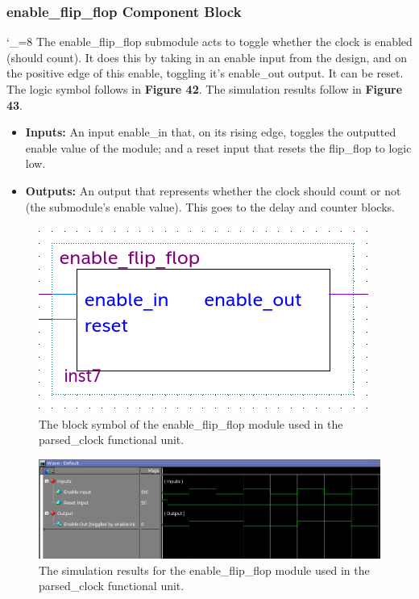 \documentclass[a4paper]{article}
\begin{document}
\subsubsection{enable\_flip\_flop Component Block}
\catcode`_=8
The enable\_flip\_flop submodule acts to toggle whether the clock is enabled (should count). It does this by taking in an enable input from the design, and on the positive edge of this enable, toggling it's enable\_out output. It can be reset. The logic symbol follows in \textbf{Figure 42}.  The simulation results follow in \textbf{Figure 43}.
\begin{itemize}
\item \textbf{Inputs:  } An input enable\_in that, on its rising edge, toggles the outputted enable value of the module; and a reset input that resets the flip\_flop to logic low.
\item \textbf{Outputs: } An output that represents whether the clock should count or not (the submodule's enable value). This goes to the delay and counter blocks.
\end{itemize}
\begin{figure}[h]
\centering
\includegraphics[width=.48\textwidth]{functional_units/parsed_clock/individual_blocks/enable_flip_flop_symbol.png}
\caption{The block symbol of the enable\_flip\_flop module used in the parsed\_clock functional unit.}
\end{figure}
\begin{figure}[h]
\centering
\includegraphics[width=.98\textwidth]{functional_units/parsed_clock/individual_blocks/enable_flip_flop_sim.png}
\caption{The simulation results for the enable\_flip\_flop module used in the parsed\_clock functional unit.}
\end{figure}
\clearpage
\end{document}
